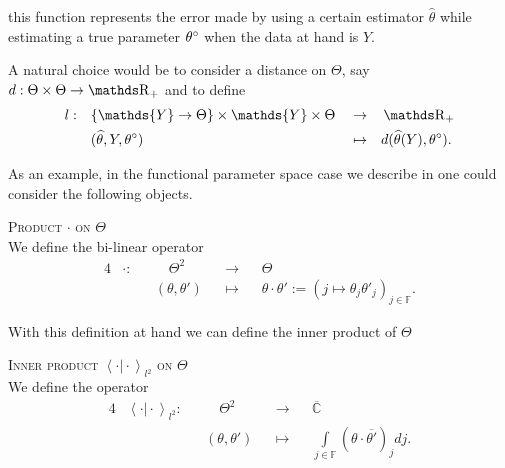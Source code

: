 \begin{Liste}[]
\item[\mylabel{INTRO_FREQ_DECISION_LOSSFUNCION}{\bfseries{The loss function} $l: (\{\mathds{Y} \rightarrow \Theta\} \times \mathds{Y} \times \Theta) \rightarrow \R_{+}$:}]

this function represents the error made by using a certain estimator $\widehat{\theta}$ while estimating a true parameter ${\theta^{\circ}_{}}$ when the data at hand is $Y$.

A natural choice would be to consider a distance on $\Theta$, say $d: \Theta \times \Theta \rightarrow \R_{+}$ and to define
\begin{alignat*}{4}
& l :&& \{\mathds{Y} \rightarrow \Theta\} \times \mathds{Y} \times \Theta && \rightarrow && \R_{+}\\
&    && (\widehat{\theta}, Y, \fxdf)                             && \mapsto     && d(\widehat{\theta}(Y), \fxdf).
\end{alignat*}

\medskip

As an example, in the functional parameter space case we describe in  one could consider the following objects.

\begin{de}{\textsc{Product $\cdot$ on $\Theta$}\\}\label{DE_INTRO_FREQ_PRODUCTTHETA}
We define the bi-linear operator
\begin{alignat*}{4}
& \cdot : && \quad \Theta^{2} && \rightarrow && \Theta \\
& && (\theta, \theta') && \mapsto && \theta \cdot \theta' := \left(j \mapsto \theta_{j} \theta'_{j}\right)_{j \in \mathds{F}}.
\end{alignat*}
\end{de}

With this definition at hand we can define the inner product of $\Theta$
\begin{de}{\textsc{Inner product $\left\langle \cdot \vert \cdot \right\rangle_{l^{2}}$ on $\Theta$}\\}\label{DE_INTRO_FREQ_SCALARTHETA}
We define the operator
\begin{alignat*}{4}
& \left\langle \cdot \vert \cdot \right\rangle_{l^{2}} : && \quad \Theta^{2} &&\rightarrow&& \overline{\mathds{C}}\\
& && (\theta, \theta') && \mapsto && \int\limits_{j \in \mathds{F}} (\theta \cdot \overline{\theta'})_{j} dj.
\end{alignat*}
\end{de}


\end{Liste}
